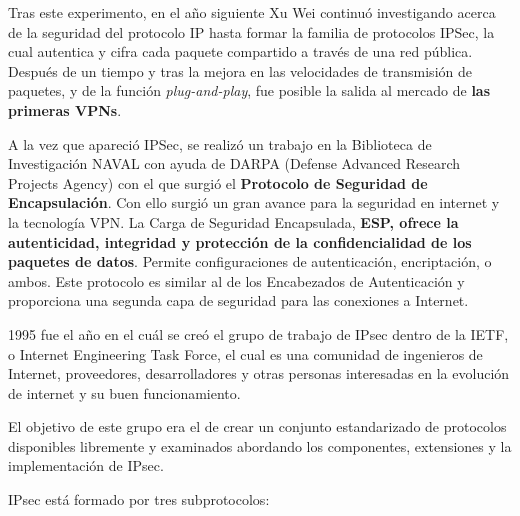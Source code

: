 Tras este experimento, en el año siguiente Xu Wei continuó
investigando acerca de la seguridad del protocolo IP hasta formar la
familia de protocolos IPSec, la cual autentica y cifra cada paquete
compartido a través de una red pública. Después de un tiempo y tras la
mejora en las velocidades de transmisión de paquetes, y de la función
\textit{plug-and-play}, fue posible la salida al mercado de
\textbf{las primeras VPNs}.

A la vez que apareció IPSec, se realizó un trabajo en la Biblioteca de
Investigación NAVAL con ayuda de DARPA (Defense Advanced Research
Projects Agency) con el que surgió el \textbf{Protocolo de Seguridad
  de Encapsulación}.  Con ello surgió un gran avance para la seguridad
en internet y la tecnología VPN.  La Carga de Seguridad Encapsulada,
\textbf{ESP, ofrece la autenticidad, integridad y protección de la
  confidencialidad de los paquetes de datos}.  Permite configuraciones
de autenticación, encriptación, o ambos.  Este protocolo es similar al
de los Encabezados de Autenticación y proporciona una segunda capa de
seguridad para las conexiones a Internet.

1995 fue el año en el cuál se creó el grupo de trabajo de IPsec dentro
de la IETF, o Internet Engineering Task Force, el cual es una
comunidad de ingenieros de Internet, proveedores, desarrolladores y
otras personas interesadas en la evolución de internet y su buen
funcionamiento.

El objetivo de este grupo era el de crear un conjunto estandarizado de
protocolos disponibles libremente y examinados abordando los
componentes, extensiones y la implementación de IPsec.

IPsec está formado por tres subprotocolos:

